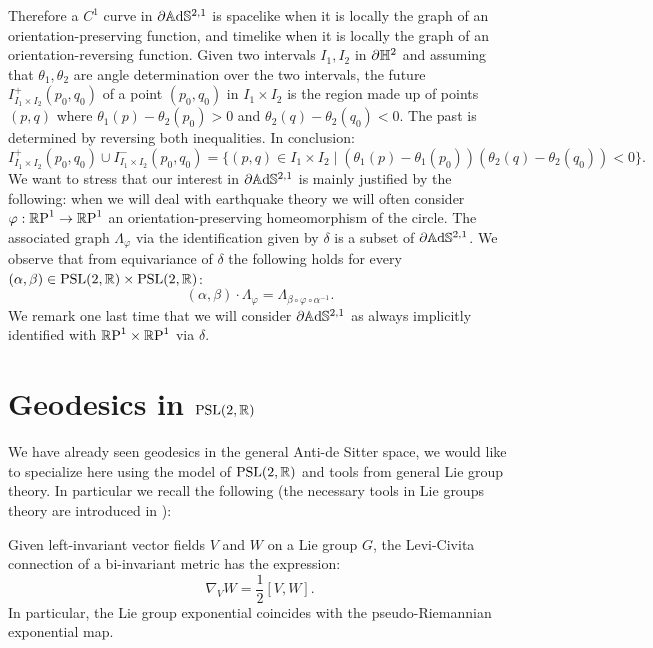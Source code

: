 Therefore a $C^1$ curve in $\partial\A^{2,1}$ is spacelike when it is locally the graph of an orientation-preserving function, and timelike when it is locally the graph of an orientation-reversing function. Given two intervals $I_1,I_2$ in $\partial\H^2$ and assuming that $\theta_1,\theta_2$ are angle determination over the two intervals, the future $I^+_{I_1\times I_2}(p_0,q_0)$ of a point $(p_0,q_0)$ in $I_1\times I_2$ is the region made up of points $(p,q)$ where $\theta_1(p)-\theta_2(p_0)>0$ and $\theta_2(q)-\theta_2(q_0)<0$. The past is determined by reversing both inequalities. In conclusion: 
\begin{equation}\label{angular}
    I^+_{I_1\times I_2}(p_0,q_0)\cup I^-_{I_1\times I_2}(p_0,q_0)=\{(p,q)\in I_1\times I_2\;|\;(\theta_1(p)-\theta_1(p_0))(\theta_2(q)-\theta_2(q_0))<0\}.
\end{equation}
We want to stress that our interest in $\partial\A^{2,1}$ is mainly justified by the following: when we will deal with earthquake theory we will often consider $\varphi:\S\to\S$ an orientation-preserving homeomorphism of the circle. The associated graph $\Lambda_\varphi$ via the identification given by $\delta$ is a subset of $\partial\A^{2,1}$. We observe that from equivariance of $\delta$ the following holds for every $(\alpha,\beta)\in\PSL\times\PSL$: 
\begin{equation}\label{graphequivariancy}
(\alpha,\beta)\cdot\Lambda_\varphi=\Lambda_{\beta\circ\varphi\circ\alpha^{-1}}.
\end{equation}
We remark one last time that we will consider $\partial\A^{2,1}$ as always implicitly identified with $\T$ via $\delta$.

\section{Geodesics in $\PSL$}\label{geosection} We have already seen geodesics in the general Anti-de Sitter space, we would like to specialize here using the model of $\PSL$ and tools from general Lie group theory. In particular we recall the following (the necessary tools in Lie groups theory are introduced in \cite{bonsanteseppi}): 
\begin{lemma}\label{331}
    Given left-invariant vector fields $V$ and $W$ on a Lie group $G$, the Levi-Civita connection of a bi-invariant metric has the expression: 
    \[
        \nabla_VW=\frac{1}{2}[V,W].
    \]
    In particular, the Lie group exponential coincides with the pseudo-Riemannian exponential map.
\end{lemma}




